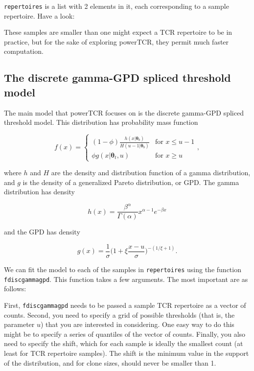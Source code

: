 \documentclass[]{article}
\newcommand{\hlstd}[1]{\textcolor[rgb]{0.251,0.251,0.251}{#1}}%
\newcommand{\hlkwd}[1]{\textcolor[rgb]{0.878,0.439,0.125}{#1}}%
\newenvironment{Shaded}{\begin{myshaded}}{\end{myshaded}}
\newcommand{\KeywordTok}[1]{\hlkwd{#1}}
\newcommand{\NormalTok}[1]{\hlstd{#1}}
\theoremstyle{definition}
\theoremstyle{definition}
\theoremstyle{definition}
\theoremstyle{remark}
\begin{document}
\texttt{repertoires} is a list with 2 elements in it, each corresponding
to a sample repertoire. Have a look:

\begin{Shaded}
\end{Shaded}

These samples are smaller than one might expect a TCR repertoire to be
in practice, but for the sake of exploring powerTCR, they permit much
faster computation.

\subsection{The discrete gamma-GPD spliced threshold
model}\label{the-discrete-gamma-gpd-spliced-threshold-model}

The main model that powerTCR focuses on is the discrete gamma-GPD
spliced threshold model. This distribution has probability mass function

\[
    f(x) =
    \begin{cases}
        (1-\phi)\frac{h(x|\boldsymbol{\theta}_b)} {H(u-1|\boldsymbol{\theta}_b)}  & \text{for $x \leq u-1$} \\
        \phi g(x|\boldsymbol{\theta}_t, u) & \text{for $x \geq u$}
    \end{cases},
\]

where \(h\) and \(H\) are the density and distribution function of a
gamma distribution, and \(g\) is the density of a generalized Pareto
distribution, or GPD. The gamma distribution has density

\[
    h(x) = \frac{\beta^\alpha}{\Gamma(\alpha)}x^{\alpha-1}e^{-\beta x}
\]

and the GPD has density

\[
    g(x) = \frac{1}{\sigma}\big(1+\xi \frac{x-u}{\sigma}\big)^{-(1/\xi +1)}.
\]

We can fit the model to each of the samples in \texttt{repertoires}
using the function \texttt{fdiscgammagpd}. This function takes a few
arguments. The most important are as follows:

First, \texttt{fdiscgammagpd} needs to be passed a sample TCR repertoire
as a vector of counts. Second, you need to specify a grid of possible
thresholds (that is, the parameter \(u\)) that you are interested in
considering. One easy way to do this might be to specify a series of
quantiles of the vector of counts. Finally, you also need to specify the
shift, which for each sample is ideally the smallest count (at least for
TCR repertoire samples). The shift is the minimum value in the support
of the distribution, and for clone sizes, should never be smaller than
1.
\end{document}
